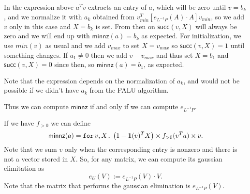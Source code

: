 In the expression above $a^Tv$ extracts an entry of $a$, which will be zero until $v=b_k$, and we normalize it with $a_k$ obtained from $v_{min}^T\left[ e_{L^{-1}P}(A)\cdot A\right]v_{min}$, so we add $v$ only in this case and $X=b_k$ is set. From then on $\mathsf{succ}(v,X)$ will always be zero and we will end up with $\mathsf{minnz}(a)=b_k$ as expected. For initialization, we use $min(v)$ as usual and we add $v_{max}$ to set $X=v_{max}$ so $\mathsf{succ}(v,X)=1$ until something changes. If $a_1\neq 0$ then we add $v-v_{max}$ and thus set $X=b_1$ and $\mathsf{succ}(v,X)=0$ since then, so $\mathsf{minnz}(a)=b_1$, as expected.

Note that the expression depends on the normalization of $a_k$, and would not be possible if we didn't have $a_k$ from the PALU algorithm.

Thus we can compute $\mathsf{minnz}$ if and only if we can compute $e_{L^{-1}P}$.

If we have $f_{>0}$ we can define $$\mathsf{minnz}(a)=\texttt{for}\, v,X \texttt{.}\, \left( 1-\mathbf{1}(v)^TX \right) \times f_{>0}(v^Ta)\times v.$$
Note that we sum $v$ only when the corresponding entry is nonzero and there is not a vector stored in $X$.
So, for any matrix, we can compute its gaussian elimitation as 
$$
e_{U}(V) :=  e_{L^{-1}P}(V) \cdot V.
$$
Note that the matrix that performs the gaussian elimination is $e_{L^{-1}P}(V)$.